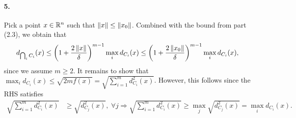 \documentclass[10pt]{article}
\begin{document}
\paragraph{5.}
Pick a point $x \in \mathbb{R}^n$ such that $\left \| x \right \| \leq \left \| x_0 \right \|$. Combined with
the bound from part (2.3), we obtain that
\[
    d_{\operatorname*{\bigcap}_i C_i}(x) \leq \left(1 + \frac{2 \left \| x \right \|}{\delta}\right)^{m-1}
    \max_i d_{C_i}(x) \leq \left(1 + \frac{2 \left \| x_0 \right \|}{\delta}\right)^{m-1}
    \max_i d_{C_i}(x),
\]
since we assume $m \geq 2$. It remains to show that $\max_i d_{C_i}(x) \leq
\sqrt{2 m f(x)} = \sqrt{\sum_{i=1}^m d_{C_i}^2(x)}$. However, this follows
since the RHS satisfies
\begin{align*}
    \sqrt{\sum_{i=1}^m d_{C_i}^2(x)} &\geq \sqrt{d_{C_j}^2(x)}, \; \forall j
    \Rightarrow \sqrt{\sum_{i=1}^m d_{C_i}^2(x)} \geq \max_j \sqrt{d_{C_j}^2(x)}
    = \max_i d_{C_i}(x).
\end{align*}
\end{document}
